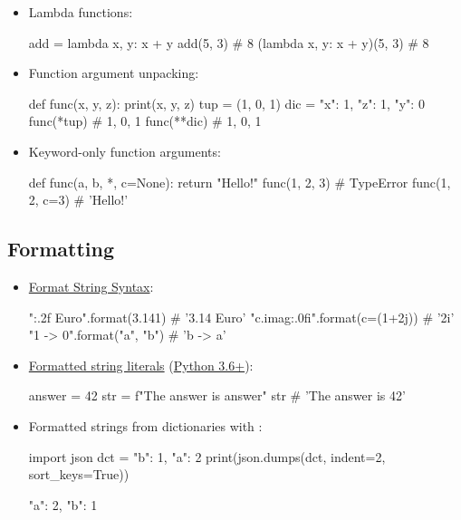 \documentclass[rules]{cheatsheet}
\begin{document}
\begin{itemize}
  \item Lambda functions:
  \begin{python}[gobble=4]
    add = lambda x, y: x + y
    add(5, 3) # 8
    (lambda x, y: x + y)(5, 3) # 8
  \end{python}

  \item Function argument unpacking:
  \begin{python}[gobble=4]
    def func(x, y, z):
      print(x, y, z)
    tup = (1, 0, 1)
    dic = {"x": 1, "z": 1, "y": 0}
    func(*tup) # 1, 0, 1
    func(**dic) # 1, 0, 1
  \end{python}

  \item Keyword-only function arguments:
  \begin{python}[gobble=4]
    def func(a, b, *, c=None):
      return "Hello!"
    func(1, 2, 3) # TypeError
    func(1, 2, c=3) # 'Hello!'
  \end{python}
\end{itemize}

\subsection{Formatting}

\begin{itemize}
  \item \href{https://docs.python.org/3/library/string.html#formatstrings}{Format String Syntax}:
  \begin{python}[gobble=4]
    "{:.2f} Euro".format(3.141) # '3.14 Euro'
    "{c.imag:.0f}i".format(c=(1+2j)) # '2i'
    "{1} -> {0}".format("a", "b") # 'b -> a'
  \end{python}

  \item \href{https://docs.python.org/3/reference/lexical_analysis.html#f-strings}{Formatted string literals} (\href{https://docs.python.org/3/whatsnew/3.6.html}{Python 3.6+}):
  \begin{python}[gobble=4]
    answer = 42
    str = f"The answer is {answer}"
    str # 'The answer is 42'
  \end{python}

  \item Formatted strings from dictionaries with \href{https://docs.python.org/3/library/json.html}{}:
  \begin{python}[gobble=4]
    import json
    dct = {"b": 1, "a": 2}
    print(json.dumps(dct, indent=2, sort_keys=True))
  \end{python}\vspace{-\baselineskip}
  \begin{pyresult}[gobble=4]
    {
      "a": 2,
      "b": 1
    }
  \end{pyresult}
\end{itemize}
\end{document}
